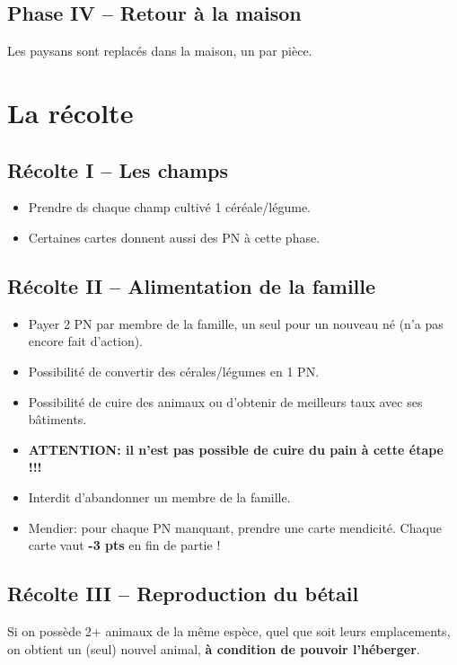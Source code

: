 \documentclass[10pt, a4paper]{article}	%
\begin{document}
\begin{multicols}{3}
\subsection{Phase IV -- Retour à la maison}
Les paysans sont replacés dans la maison, un par pièce.





\section{La récolte}

\subsection{Récolte I -- Les champs}
\begin{itemize}
\item Prendre ds chaque champ cultivé 1 céréale/légume.
\item Certaines cartes donnent aussi des PN à cette phase.
\end{itemize}



\subsection{Récolte II -- Alimentation de la famille}
\begin{itemize}
\item Payer 2 PN par membre de la famille, un seul pour un nouveau né (n'a pas encore fait d'action).
\item Possibilité de convertir des cérales/légumes en 1 PN.
\item Possibilité de cuire des animaux ou d'obtenir de meilleurs taux avec ses bâtiments.
\item \textbf{ATTENTION: il n'est pas possible de cuire du pain à cette étape !!!}
\item Interdit d'abandonner un membre de la famille.
\item Mendier: pour chaque PN manquant, prendre une carte \og mendicité\fg{}. Chaque carte vaut \textbf{-3 pts} en fin de partie !
\end{itemize}


\subsection{Récolte III -- Reproduction du bétail}
Si on possède 2+ animaux de la même espèce, quel que soit leurs emplacements, on obtient un (seul) nouvel animal, \textbf{à condition de pouvoir l'héberger}.


\end{multicols}
\end{document}
